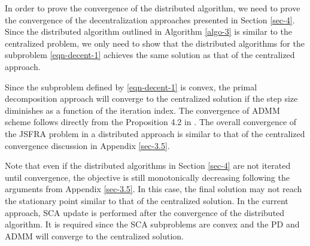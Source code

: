 In order to prove the convergence of the distributed algorithm, we need to prove the convergence of the decentralization approaches presented in Section \ref{sec-4}. Since the distributed algorithm outlined in Algorithm \ref{algo-3} is similar to the centralized problem, we only need to show that the distributed algorithms for the subproblem \eqref{eqn-decent-1} achieves the same solution as that of the centralized approach. 

Since the subproblem defined by \eqref{eqn-decent-1} is convex, the primal decomposition approach will converge to the centralized solution if the step size diminishes as a function of the iteration index. The convergence of \ac{ADMM} scheme follows directly from the Proposition 4.2 in \cite{bertsekas1989parallel}. The overall convergence of the \ac{JSFRA} problem in a distributed approach is similar to that of the centralized convergence discussion in Appendix \ref{sec-3.5}.

Note that even if the distributed algorithms in Section \ref{sec-4} are not iterated until convergence, the objective is still monotonically decreasing following the arguments from Appendix \ref{sec-3.5}. In this case, the final solution may not reach the stationary point similar to that of the centralized solution. In the current approach, \ac{SCA} update is performed after the convergence of the distributed algorithm. It is required since the \ac{SCA} subproblems are convex and the \acl{PD} and \ac{ADMM} will converge to the centralized solution.




